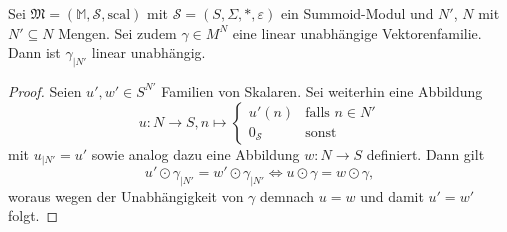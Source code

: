 \documentclass{article}
\begin{document}
\begin{lemma}\label{Lemma_UnabhEinschr}
  Sei $\mathfrak{M} = (\mathbb{M}, \mathcal{S}, \text{scal})$
  mit $\mathcal{S} = (S, \Sigma, \ast, \varepsilon)$ ein Summoid-Modul
  und $N'$, $N$ mit $N' \subseteq N$ Mengen.
  Sei zudem $\gamma \in M^N$ eine linear unabhängige Vektorenfamilie.
  Dann ist $\gamma_{\mid N'}$ linear unabhängig.
\end{lemma}
\begin{proof}
  Seien $u', w' \in S^{N'}$ Familien von Skalaren.
  Sei weiterhin eine Abbildung
  \begin{equation*}
    u \colon N \to S, n \mapsto
    \begin{cases}
      u'(n) & \text{falls } n \in N' \\
      0_\mathcal{S} & \text{sonst}
    \end{cases}
  \end{equation*}
  mit $u_{\mid N'} = u'$ sowie analog dazu eine Abbildung $w \colon N \to S$ definiert.
  Dann gilt
  \begin{equation*}
    u' \odot \gamma_{\mid N'} = w' \odot \gamma_{\mid N'} \iff u \odot \gamma = w \odot \gamma,
  \end{equation*}
  woraus wegen der Unabhängigkeit von $\gamma$ demnach $u = w$ und damit $u' = w'$ folgt.
\end{proof}
\end{document}
